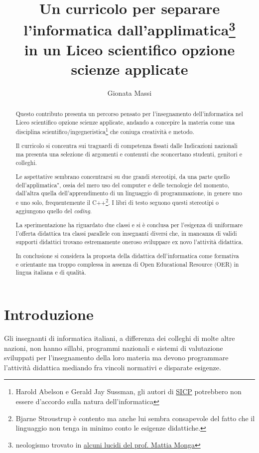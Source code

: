 \documentclass[a4paper]{easychair}
\title{Un curricolo per separare l'informatica dall'applimatica\thanks{neologismo %
trovato in \href{https://aladdin.unimi.it/materiali/talk/2012_mirabilandia.pdf}%
{alcuni lucidi del prof. Mattia Monga}}\\ in un %
Liceo scientifico opzione scienze applicate}
\author{
Gionata Massi\institute{
  IIS Savoia Benincasa, Ancona (AN)
 }
}
\institute{
  IIS Savoia Benincasa, Ancona (AN)\\
  \email{gionata.massi@savoiabenincasa.it}
}
\begin{document}
\maketitle

\begin{abstract}
Questo contributo presenta un percorso pensato per l'insegnamento dell'informatica
nel Liceo scientifico opzione scienze applicate, andando a concepire la materia come
una disciplina scientifico/ingegneristica\footnote{Harold Abelson e 
Gerald Jay Sussman, gli autori di \href{https://web.mit.edu/6.001/6.037/sicp.pdf}{SICP}
potrebbero non essere d'accordo sulla natura dell'informatica} che coniuga creatività e metodo.

Il curricolo si concentra sui traguardi di competenza fissati dalle Indicazioni
nazionali~\cite{indicazioniNazionali}
ma presenta una selezione di argomenti e contenuti
che sconcertano studenti, genitori e colleghi.

Le aspettative sembrano concentrarsi su due grandi stereotipi,
da una parte quello dell'applimatica$\phantom{}^\star$,
ossia del mero uso del computer e delle tecnologie del momento,
dall'altra quella dell'apprendimento di un linguaggio di programmazione, in genere uno e uno solo,
frequentemente il C++\footnote{Bjarne Stroustrup è contento ma anche lui sembra
consapevole del fatto che il linguaggio non tenga in minimo conto le esigenze didattiche.}.
I libri di testo seguono questi stereotipi o aggiungono quello del \textit{coding}.

La sperimentazione ha riguardato due classi e si è conclusa per l'esigenza
di uniformare l'offerta didattica tra classi parallele con insegnanti diversi che,
in mancanza di validi supporti didattici trovano estremamente oneroso sviluppare
ex novo l'attività didattica.

In conclusione si considera la proposta della didattica dell'informatica come
formativa e orientante ma troppo complessa in assenza di 
Open Educational Resource (OER) in lingua italiana e di qualità.
\end{abstract}

\setcounter{tocdepth}{2}
{\small
\tableofcontents}

\section{Introduzione}
\label{sect:introduction}

Gli insegnanti di informatica italiani, a differenza dei colleghi di molte
altre nazioni, non hanno sillabi, programmi nazionali e sistemi di valutazione
sviluppati per l'insegnamento della loro materia ma devono
programmare l'attività didattica mediando fra vincoli normativi e
disparate esigenze.
\end{document}

